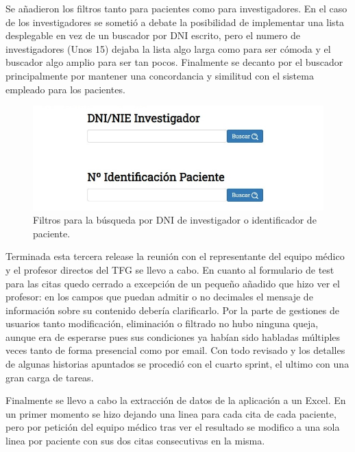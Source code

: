Se añadieron los filtros tanto para pacientes como para investigadores. En el caso de los investigadores se sometió a debate la posibilidad de implementar una lista desplegable en vez de un buscador por DNI escrito, pero el numero de investigadores (Unos 15) dejaba la lista algo larga como para ser cómoda y el buscador algo amplio para ser tan pocos. Finalmente se decanto por el buscador principalmente por mantener una concordancia y similitud con el sistema empleado para los pacientes.

\begin{figure}[h]
    \centering
     \includegraphics[width=1\textwidth]{images/filtros.jpg}
    \caption{Filtros para la búsqueda por DNI de investigador o identificador de paciente.}
\end{figure}

Terminada esta tercera release la reunión con el representante del equipo médico y el profesor directos del TFG se llevo a cabo. En cuanto al formulario de test para las citas quedo cerrado a excepción de un pequeño añadido que hizo ver el profesor: en los campos que puedan admitir o no decimales el mensaje de información sobre su contenido debería clarificarlo. Por la parte de gestiones de usuarios tanto modificación, eliminación o filtrado no hubo ninguna queja, aunque era de esperarse pues sus condiciones ya habían sido habladas múltiples veces tanto de forma presencial como por email. Con todo revisado y los detalles de algunas historias apuntados se procedió con el cuarto sprint, el ultimo con una gran carga de tareas.
\newline

Finalmente se llevo a cabo la extracción de datos de la aplicación a un Excel. En un primer momento se hizo dejando una linea para cada cita de cada paciente, pero por petición del equipo médico tras ver el resultado se modifico a una sola linea por paciente con sus dos citas consecutivas en la misma.

